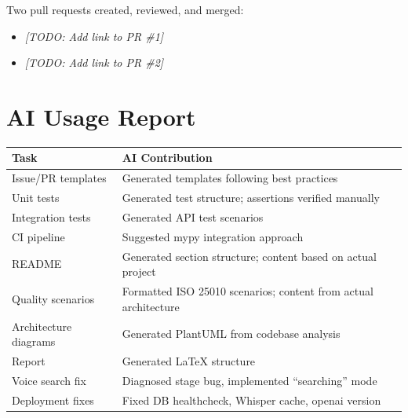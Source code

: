 \documentclass[11pt, a4paper]{article}
\begin{document}
Two pull requests created, reviewed, and merged:

\begin{itemize}
    \item \textit{[TODO: Add link to PR \#1]}
    \item \textit{[TODO: Add link to PR \#2]}
\end{itemize}

\section{AI Usage Report}

\begin{longtable}{p{4cm}p{10cm}}
\toprule
\textbf{Task} & \textbf{AI Contribution} \\
\midrule
Issue/PR templates & Generated templates following best practices \\
Unit tests & Generated test structure; assertions verified manually \\
Integration tests & Generated API test scenarios \\
CI pipeline & Suggested mypy integration approach \\
README & Generated section structure; content based on actual project \\
Quality scenarios & Formatted ISO 25010 scenarios; content from actual architecture \\
Architecture diagrams & Generated PlantUML from codebase analysis \\
Report & Generated LaTeX structure \\
Voice search fix & Diagnosed stage bug, implemented ``searching'' mode \\
Deployment fixes & Fixed DB healthcheck, Whisper cache, openai version \\
\bottomrule
\end{longtable}
\end{document}

